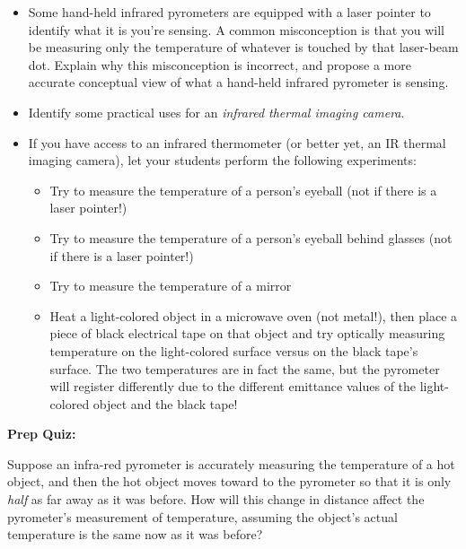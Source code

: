 \begin{itemize}
\item{} Some hand-held infrared pyrometers are equipped with a laser pointer to identify what it is you're sensing.  A common misconception is that you will be measuring only the temperature of whatever is touched by that laser-beam dot.  Explain why this misconception is incorrect, and propose a more accurate conceptual view of what a hand-held infrared pyrometer is sensing.
\item{} Identify some practical uses for an {\it infrared thermal imaging camera}.
\item{} If you have access to an infrared thermometer (or better yet, an IR thermal imaging camera), let your students perform the following experiments:
\begin{itemize}

\item{} Try to measure the temperature of a person's eyeball (not if there is a laser pointer!)
\item{} Try to measure the temperature of a person's eyeball behind glasses (not if there is a laser pointer!)
\item{} Try to measure the temperature of a mirror
\item{} Heat a light-colored object in a microwave oven (not metal!), then place a piece of black electrical tape on that object and try optically measuring temperature on the light-colored surface versus on the black tape's surface.  The two temperatures are in fact the same, but the pyrometer will register differently due to the different emittance values of the light-colored object and the black tape!
\end{itemize}
\end{itemize}












\vfil \eject

\noindent
{\bf Prep Quiz:}

Suppose an infra-red pyrometer is accurately measuring the temperature of a hot object, and then the hot object moves toward to the pyrometer so that it is only {\it half} as far away as it was before.  How will this change in distance affect the pyrometer's measurement of temperature, assuming the object's actual temperature is the same now as it was before?

